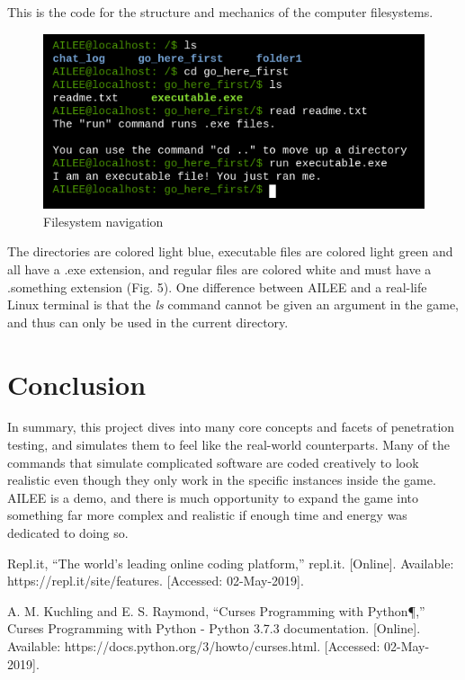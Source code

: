 \documentclass[conference]{IEEEtran}
\begin{document}


This is the code for the structure and mechanics of the computer filesystems. 

\begin{figure}[htbp]
	\centerline{\includegraphics[scale=2]{filesystem-example}}
	\caption{Filesystem navigation}
	\label{fig}
\end{figure}

The directories are colored light blue, executable files are colored light green and all have a .exe extension, and regular files are colored white and must have a .something extension (Fig. 5). One difference between AILEE and a real-life Linux terminal is that the \textit{ls} command cannot be given an argument in the game, and thus can only be used in the current directory.

\section{Conclusion}
In summary, this project dives into many core concepts and facets of penetration testing, and simulates them to feel like the real-world counterparts. Many of the commands that simulate complicated software are coded creatively to look realistic even though they only work in the specific instances inside the game. AILEE is a demo, and there is much opportunity to expand the game into something far more complex and realistic if enough time and energy was dedicated to doing so.

\begin{thebibliography}{00}
 Repl.it, “The world's leading online coding platform,” repl.it. [Online]. Available: https://repl.it/site/features. [Accessed: 02-May-2019].

 A. M. Kuchling and E. S. Raymond, “Curses Programming with Python¶,” Curses Programming with Python - Python 3.7.3 documentation. [Online]. Available: https://docs.python.org/3/howto/curses.html. [Accessed: 02-May-2019].

\end{thebibliography}
\end{document}
